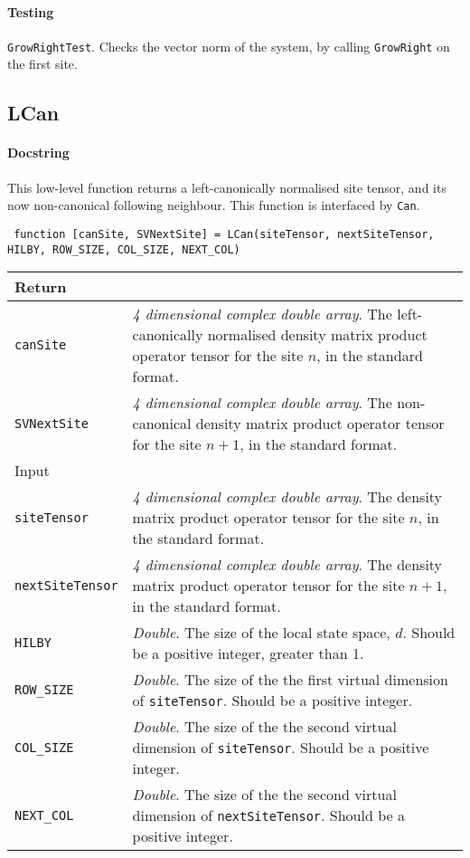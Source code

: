  \paragraph{Testing} \lstinline$GrowRightTest$. Checks the vector norm of the system, by calling \lstinline$GrowRight$ on the first site.

 \subsection{LCan}
 \paragraph{Docstring} This low-level function returns a left-canonically normalised site tensor, and its now non-canonical following neighbour. This function is interfaced by \lstinline$Can$.  
 \begin{lstlisting}
 function [canSite, SVNextSite] = LCan(siteTensor, nextSiteTensor, HILBY, ROW_SIZE, COL_SIZE, NEXT_COL) \end{lstlisting}
 \begin{longtabu}{X[1,l]X[4,l]}
 \hline
 Return & \\ \hline
 \lstinline$canSite$ & \emph{4 dimensional complex double array}. The left-canonically normalised density matrix product operator tensor for the site \(n\), in the standard format. \\
 \lstinline$SVNextSite$ & \emph{4 dimensional complex double array}. The non-canonical density matrix product operator tensor for the site \(n+1\), in the standard format. \\ \hline
 Input & \\ \hline
 \lstinline$siteTensor$ & \emph{4 dimensional complex double array}. The density matrix product operator tensor for the site \(n\), in the standard format. \\
 \lstinline$nextSiteTensor$ & \emph{4 dimensional complex double array}. The density matrix product operator tensor for the site \(n+1\), in the standard format. \\
 \lstinline$HILBY$ & \emph{Double}. The size of the local state space, \(d\). Should be a positive integer, greater than 1. \\
 \lstinline$ROW_SIZE$ & \emph{Double}. The size of the the first virtual dimension of \lstinline$siteTensor$. Should be a positive integer.  \\
 \lstinline$COL_SIZE$ & \emph{Double}. The size of the the second virtual dimension of \lstinline$siteTensor$. Should be a positive integer. \\
 \lstinline$NEXT_COL$ & \emph{Double}. The size of the the second virtual dimension of \lstinline$nextSiteTensor$. Should be a positive integer. \\
 \hline
 \end{longtabu} 
